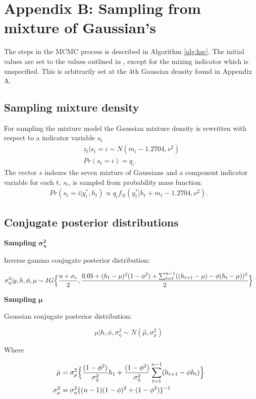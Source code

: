 \documentclass[12pt, a4paper]{article}
\begin{document}
\newpage

\section{Appendix B: Sampling from mixture of Gaussian's}
    The steps in the MCMC process is described in Algorithm \ref{alg:ksc}. The initial values are set to the values outlined in \citet{kim1998stochastic}, except for the mixing indicator which is unspecified. This is arbitrarily set at the 4th Gaussian density found in Appendix A.
        
    \subsection*{Sampling mixture density}
    For sampling the mixture model the Gaussian mixture density is rewritten with respect to a indicator variable $s_t$
        \begin{align}
        &z_t | s_t = i \sim N(m_i - 1.2704, \nu^2) \\
        &Pr(s_t = i) = q_i.
        \end{align}
        The vector $s$ indexes the seven mixture of Gaussians and a component indicator variable for each t, $s_t$, is sampled from probability mass function: 
        \begin{align}
        Pr(s_t = i | y_t^{\ast}, h_t) \propto q_i f_N(y_t^{\ast} | h_t + m_t - 1.2704, \nu^2).
        \end{align}



\subsection*{Conjugate posterior distributions}

\textbf{Sampling} $\boldsymbol{\sigma_{\eta}^2}$

Inverse gamma conjugate posterior distribution:

$$
\sigma^2_{\eta} | y,h,\phi,\mu \sim IG \Bigl\{\frac{n+\sigma_r}{2}, \frac{0.05 + (h_1 - \mu)^2 (1 - \phi^2) + \sum_{t=1}^{n-1}((h_{t+1} - \mu) - \phi(h_t - \mu))^2}{2}\Bigr\}
$$

\textbf{Sampling}  $\boldsymbol{\mu}$

Gaussian conjugate posterior distribution:

$$
\mu | h,\phi,\sigma^2_{\eta}  \sim N(\hat{\mu}, \sigma^2_{\mu})
$$

Where

$$
\begin{aligned}
\hat{\mu} &= \sigma^2_{\mu} \Bigl\{\frac{(1-\phi^2)}{\sigma_{\eta}^2}h_1 +\frac{(1-\phi^2)}{\sigma_{\eta}^2} \sum_{t=1}^{n-1} (h_{t+1} - \phi h_t)\Bigr\} \\
\sigma^2_{\mu} &= \sigma^2_{\eta} \{(n-1)(1-\phi)^2 + (1-\phi^2)\}^{-1}
\end{aligned}
$$
\end{document}
